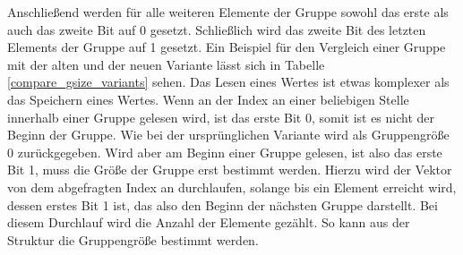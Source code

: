 Anschließend werden für alle weiteren Elemente der Gruppe sowohl das erste als auch das zweite Bit auf 0 gesetzt.
Schließlich wird das zweite Bit des letzten Elements der Gruppe auf 1 gesetzt.
Ein Beispiel für den Vergleich einer Gruppe mit der alten und der neuen Variante lässt sich in Tabelle \ref{compare_gsize_variants} sehen.
Das Lesen eines Wertes ist etwas komplexer als das Spei\-chern eines Wertes.
Wenn an der Index an einer beliebigen Stelle innerhalb einer Gruppe gelesen wird, ist das erste Bit 0, somit ist es nicht der Beginn der Gruppe.
Wie bei der ursprünglichen Variante wird als Gruppengröße 0 zurückgegeben.
Wird aber am Beginn einer Gruppe gelesen, ist also das erste Bit 1, muss die Größe der Gruppe erst bestimmt werden.
Hierzu wird der Vektor von dem abgefragten Index an durchlaufen, solange bis ein Element erreicht wird, dessen erstes Bit 1 ist, das also den Beginn der nächsten Gruppe darstellt.
Bei diesem Durchlauf wird die Anzahl der Elemente gezählt.
So kann aus der Struktur die Gruppengröße bestimmt werden. \par



